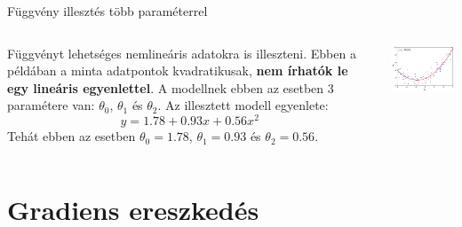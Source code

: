 \documentclass[english, aspectratio=169]{beamer}
\makeatletter
\let\origtableofcontents=\tableofcontents
\def\tableofcontents{\@ifnextchar[{\origtableofcontents}{\gobbletableofcontents}}
\def\gobbletableofcontents#1{\origtableofcontents}
\makeatother
\begin{document}
\begin{frame}{Függvény illesztés több paraméterrel}
\begin{columns}
\begin{column}{.5\textwidth}
Függvényt lehetséges nemlineáris adatokra is illeszteni. Ebben a példában a minta adatpontok kvadratikusak, \textbf{nem írhatók le egy lineáris egyenlettel}. A modellnek ebben az esetben $3$ paramétere van: $\theta_0$, $\theta_1$ és $\theta_2$. Az illesztett modell egyenlete: 
\[
y=1.78 + 0.93x + 0.56 x^2
\]
Tehát ebben az esetben $\theta_0=1.78$, $\theta_1=0.93$ és $\theta_2=0.56$.
\end{column}
\begin{column}{.5\textwidth}
\begin{center}
\includegraphics[width=7cm, keepaspectratio]{images/ql_10.png}
\end{center}
\end{column}
\end{columns}
\end{frame}

\section{Gradiens ereszkedés}

\begin{frame}
\tableofcontents[currentsection]
\end{frame}
\end{document}
